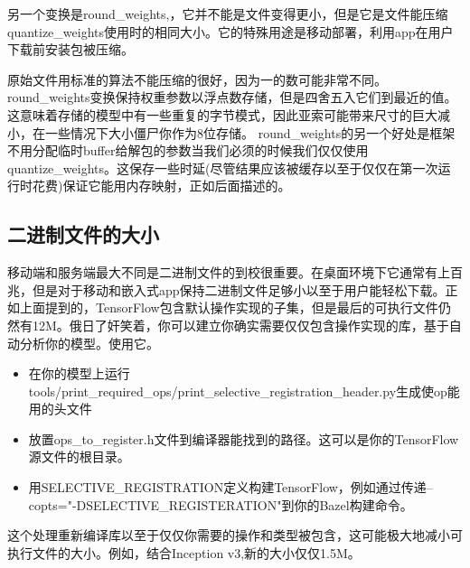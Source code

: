 另一个变换是round\_weights,，它并不能是文件变得更小，但是它是文件能压缩quantize\_weights使用时的相同大小。它的特殊用途是移动部署，利用app在用户下载前安装包被压缩。

原始文件用标准的算法不能压缩的很好，因为一的数可能非常不同。round\_weights变换保持权重参数以浮点数存储，但是四舍五入它们到最近的值。这意味着存储的模型中有一些重复的字节模式，因此亚索可能带来尺寸的巨大减小，在一些情况下大小僵尸你作为8位存储。
round\_weights的另一个好处是框架不用分配临时buffer给解包的参数当我们必须的时候我们仅仅使用quantize\_weights。这保存一些时延(尽管结果应该被缓存以至于仅仅在第一次运行时花费)保证它能用内存映射，正如后面描述的。
\subsection{二进制文件的大小}
移动端和服务端最大不同是二进制文件的到校很重要。在桌面环境下它通常有上百兆，但是对于移动和嵌入式app保持二进制文件足够小以至于用户能轻松下载。正如上面提到的，TensorFlow包含默认操作实现的子集，但是最后的可执行文件仍然有12M。俄日了奸笑着，你可以建立你确实需要仅仅包含操作实现的库，基于自动分析你的模型。使用它。
\begin{itemize}
\item 在你的模型上运行tools/print\_required\_ops/print\_selective\_registration\_header.py生成使op能用的头文件
\item 放置ops\_to\_register.h文件到编译器能找到的路径。这可以是你的TensorFlow源文件的根目录。
\item 用SELECTIVE\_REGISTRATION定义构建TensorFlow，例如通过传递--copts="-DSELECTIVE\_REGISTERATION"到你的Bazel构建命令。
\end{itemize}
这个处理重新编译库以至于仅仅你需要的操作和类型被包含，这可能极大地减小可执行文件的大小。例如，结合Inception v3,新的大小仅仅1.5M。
